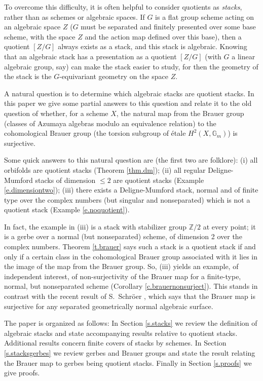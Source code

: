 \documentclass[12pt]{amsart}
\newcommand{\Z}{{\mathbb Z}}
\newcommand{\G}{{\mathbb G}}
\theoremstyle{plain}
\theoremstyle{definition}
\theoremstyle{remark}
\begin{document}
To overcome this difficulty, it is often helpful
to consider quotients as {\it stacks}, rather than as schemes or algebraic
spaces.  If $G$ is a flat group scheme acting on an algebraic space $Z$
($G$ must be separated and finitely presented over some base scheme,
with the space $Z$ and the action map defined over this base),
then a quotient $[Z/G]$ always exists as a stack,
and this stack is algebraic.
Knowing that an algebraic stack
has a presentation as a quotient $[Z/G]$ (with $G$ a linear algebraic
group, say) can
make the stack easier to study, for then
the geometry of the stack is the $G$-equivariant
geometry on the space $Z$.

A natural question is to determine which algebraic stacks are quotient stacks.
In this paper we give some partial answers to this question and relate
it to the old question
of whether, for a scheme $X$, the natural map from the Brauer group
(classes of Azumaya algebras modulo an equivalence relation)
to the cohomological Brauer
group (the torsion subgroup of \'etale $H^2(X,\G_m)$) is surjective.

Some quick answers to this natural question are (the first two are
folklore):
(i) all orbifolds are quotient stacks (Theorem \ref{thm.dm});
(ii) all regular Deligne-Mumford stacks of dimension $\le 2$ are
quotient stacks
(Example \ref{e.dimensiontwo});
(iii) there exists a Deligne-Mumford stack, normal and of finite type
over the complex numbers (but singular and nonseparated) which is
not a quotient stack (Example \ref{e.noquotient}).

In fact, the example in (iii) is a stack
with stabilizer group $\Z/2$ at every point;
it is a gerbe over a normal (but nonseparated) scheme, of dimension 2
over the complex numbers.
Theorem \ref{t.brauer} says such a stack is a quotient stack
if and only if a certain class in the cohomological Brauer group
associated with it lies in the image of the map from the Brauer group. So,
(iii) yields an example, of independent interest, of non-surjectivity of
the Brauer map for a finite-type, normal, but nonseparated scheme
(Corollary \ref{c.brauernonsurject}). This stands in contrast with the
recent result of S.~Schr\"oer \cite{schr}, which says that
the Brauer map is surjective for any separated geometrically normal
algebraic surface.

The paper is organized as follows:
In Section \ref{s.stacks} we review the definition of algebraic stacks
and state accompanying results relative to quotient stacks.
Additional results concern finite covers of stacks by schemes.
In Section \ref{s.stacksgerbes} we review gerbes and Brauer groups
and state the result relating the Brauer map to
gerbes being quotient stacks. Finally in Section \ref{s.proofs}
we give proofs.
\end{document}

